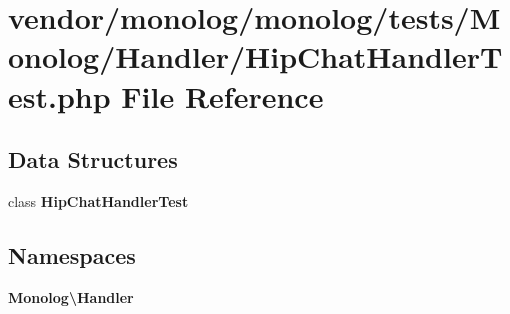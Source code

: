 \section{vendor/monolog/monolog/tests/\+Monolog/\+Handler/\+Hip\+Chat\+Handler\+Test.php File Reference}
\label{_hip_chat_handler_test_8php}
\subsection*{Data Structures}
\begin{DoxyCompactItemize}
\item 
class {\bf Hip\+Chat\+Handler\+Test}
\end{DoxyCompactItemize}
\subsection*{Namespaces}
\begin{DoxyCompactItemize}
\item 
 {\bf Monolog\textbackslash{}\+Handler}
\end{DoxyCompactItemize}
